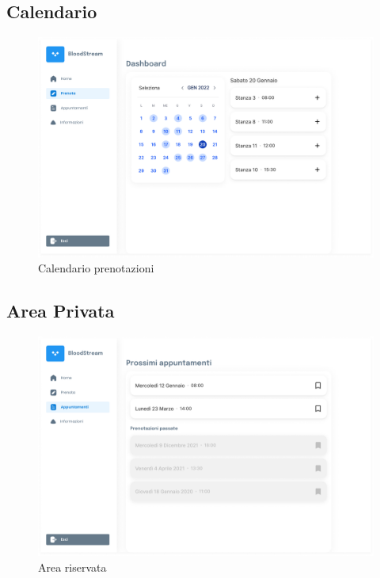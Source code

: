 \documentclass{article}
\begin{document}
\FloatBarrier

\clearpage
\subsection{Calendario}
\begin{figure}[htp]
\centering
\includegraphics[width=\textwidth,height=\textheight,keepaspectratio]{media/bloodUI-2.png}
\caption{Calendario prenotazioni}
\end{figure}

\FloatBarrier

\clearpage
\subsection{Area Privata}
\begin{figure}[htp]
\centering
\includegraphics[width=\textwidth,height=\textheight,keepaspectratio]{media/bloodUI-3.png}
\caption{Area riservata}
\end{figure}
\end{document}
